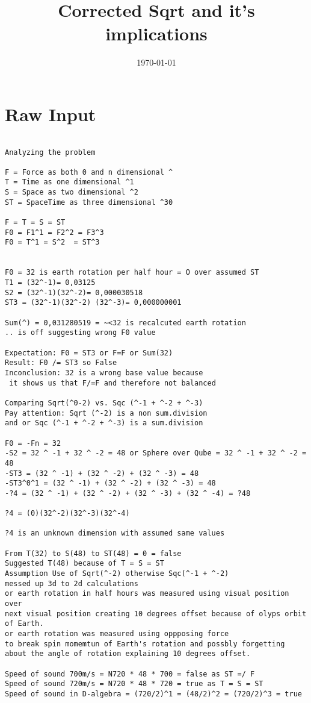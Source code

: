\documentclass{article}
\title{Corrected Sqrt and it's implications}
\author^{R.P.N. Esseling}
\date{\today}
\begin{document}
\maketitle

\section*{Raw Input}
\begin{verbatim}

Analyzing the problem

F = Force as both 0 and n dimensional ^
T = Time as one dimensional ^1
S = Space as two dimensional ^2
ST = SpaceTime as three dimensional ^30

F = T = S = ST
F0 = F1^1 = F2^2 = F3^3
F0 = T^1 = S^2  = ST^3


F0 = 32 is earth rotation per half hour = O over assumed ST 
T1 = (32^-1)= 0,03125
S2 = (32^-1)(32^-2)= 0,000030518
ST3 = (32^-1)(32^-2) (32^-3)= 0,000000001

Sum(^) = 0,031280519 = ~<32 is recalcuted earth rotation 
.. is off suggesting wrong F0 value

Expectation: F0 = ST3 or F=F or Sum(32)
Result: F0 /= ST3 so False
Inconclusion: 32 is a wrong base value because
 it shows us that F/=F and therefore not balanced

Comparing Sqrt(^0-2) vs. Sqc (^-1 + ^-2 + ^-3)
Pay attention: Sqrt (^-2) is a non sum.division 
and or Sqc (^-1 + ^-2 + ^-3) is a sum.division

F0 = -Fn = 32 
-S2 = 32 ^ -1 + 32 ^ -2 = 48 or Sphere over Qube = 32 ^ -1 + 32 ^ -2 = 48
-ST3 = (32 ^ -1) + (32 ^ -2) + (32 ^ -3) = 48
-ST3^0^1 = (32 ^ -1) + (32 ^ -2) + (32 ^ -3) = 48
-?4 = (32 ^ -1) + (32 ^ -2) + (32 ^ -3) + (32 ^ -4) = ?48

?4 = (0)(32^-2)(32^-3)(32^-4)

?4 is an unknown dimension with assumed same values

From T(32) to S(48) to ST(48) = 0 = false
Suggested T(48) because of T = S = ST
Assumption Use of Sqrt(^-2) otherwise Sqc(^-1 + ^-2) 
messed up 3d to 2d calculations 
or earth rotation in half hours was measured using visual position over 
next visual position creating 10 degrees offset because of olyps orbit of Earth.
or earth rotation was measured using oppposing force
to break spin momemtun of Earth's rotation and possbly forgetting 
about the angle of rotation explaining 10 degrees offset.

Speed of sound 700m/s = N720 * 48 * 700 = false as ST =/ F
Speed of sound 720m/s = N720 * 48 * 720 = true as T = S = ST 
Speed of sound in D-algebra = (720/2)^1 = (48/2)^2 = (720/2)^3 = true


\end{verbatim}
\end{document}
